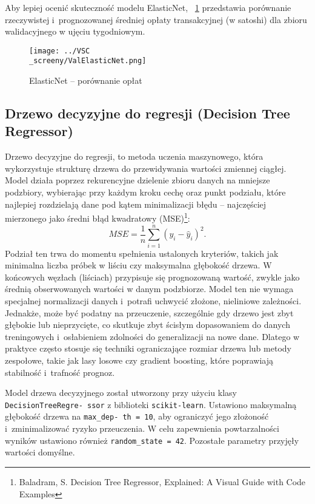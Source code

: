 \documentclass[12pt,a4paper]{report}
\theoremstyle{definition} %
\begin{document}
	Aby lepiej ocenić skuteczność modelu ElasticNet, \figurename~\ref{fig:wykresElasticNet} przedstawia porównanie rzeczywistej i~prognozowanej średniej opłaty transakcyjnej (w satoshi) dla zbioru walidacyjnego w ujęciu tygodniowym.	

	\begin{figure}[H]
	    \centering
	    \texttt{[image: ../VSC\\\_screeny/ValElasticNet.png]} 
	    \caption{ElasticNet – porównanie opłat}
	    \label{fig:wykresElasticNet}
	\end{figure}

	\subsection{Drzewo decyzyjne do regresji (Decision Tree Regressor)}
	Drzewo decyzyjne do regresji, to metoda uczenia maszynowego, która wykorzystuje strukturę drzewa do przewidywania wartości zmiennej ciągłej. Model działa poprzez rekurencyjne dzielenie zbioru danych na mniejsze podzbiory, wybierając przy każdym kroku cechę oraz punkt podziału, które najlepiej rozdzielają dane pod kątem minimalizacji błędu – najczęściej mierzonego jako średni błąd kwadratowy (MSE)\footnote{Baladram, S. Decision Tree Regressor, Explained: A Visual Guide with Code Examples}:
	\[
	MSE = \frac{1}{n} \sum_{i=1}^{n} \left( y_i - \hat{y}_i \right)^2.
	\]
	Podział ten trwa do momentu spełnienia ustalonych kryteriów, takich jak minimalna liczba próbek w liściu czy maksymalna głębokość drzewa. W końcowych węzłach (liściach) przypisuje się prognozowaną wartość, zwykle jako średnią obserwowanych wartości w danym podzbiorze.
	Model ten nie wymaga specjalnej normalizacji danych i~potrafi uchwycić złożone, nieliniowe zależności. Jednakże, może być podatny na przeuczenie, szczególnie gdy drzewo jest zbyt głębokie lub nieprzycięte, co skutkuje zbyt ścisłym dopasowaniem do danych treningowych i~osłabieniem zdolności do generalizacji na nowe dane. Dlatego w praktyce 			często stosuje się techniki ograniczające rozmiar drzewa lub metody zespołowe, takie jak lasy losowe czy gradient boosting, które poprawiają stabilność i~trafność prognoz.

	Model drzewa decyzyjnego został utworzony przy użyciu klasy \texttt{DecisionTreeRegre- ssor} z biblioteki \texttt{scikit-learn}. Ustawiono maksymalną głębokość drzewa na \texttt{max\_dep- th = 10}, aby ograniczyć jego złożoność i~zminimalizować ryzyko przeuczenia. W celu zapewnienia powtarzalności wyników ustawiono również \texttt{random\_state = 42}. Pozostałe parametry przyjęły wartości domyślne.
\end{document}
